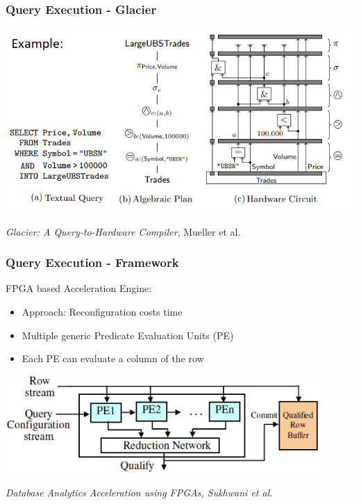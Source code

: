 \documentclass{beamer}
\begin{document}
\begin{frame}
\frametitle{Query Execution - Glacier}
\begin{center}
	\includegraphics[width=1.0\textwidth]{img/glacier.png}
\end{center}
\begin{center}
	\small \emph{Glacier: A Query-to-Hardware Compiler}, Mueller et al.
\end{center}

\end{frame}

\begin{frame}
	\frametitle{Query Execution - Framework}
	FPGA based Acceleration Engine:
	\begin{itemize}
		\item Approach: Reconfiguration costs time
		\item Multiple generic Predicate Evaluation Units (PE)
		\item Each PE can evaluate a column of the row
	\end{itemize}
	\vspace*{0.2cm}
	\includegraphics[width=0.9\textwidth]{img/row_stream.PNG}
	\vspace*{0.1cm}
	\begin{center}
		\small \emph{Database Analytics Acceleration using FPGAs, Sukhwani et al.}
	\end{center}
\end{frame}
\end{document}

